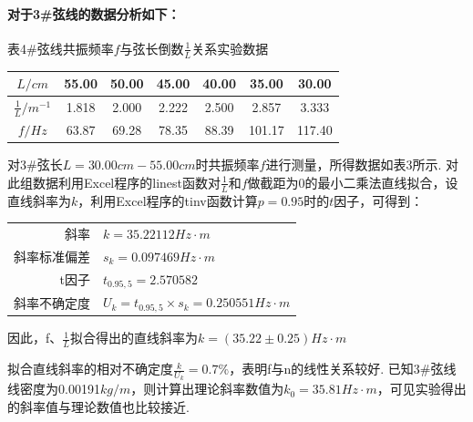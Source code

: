 \documentclass[UTF8]{ctexart}
\begin{document}
\paragraph{对于3\#弦线的数据分析如下：}
\begin{center}
{\kaishu 表4\#弦线共振频率$f$与弦长倒数$\frac{1}{L}$关系实验数据}
\begin{tabular}{|c|c|c|c|c|c|c|}
\hline
	$L/cm$&55.00&50.00&45.00&40.00&35.00&30.00\\
\hline
	$\frac{1}{L}/m^{-1}$&1.818&2.000&2.222&2.500&2.857&3.333\\
\hline
	{$f/Hz$}&{63.87}&{69.28}&{78.35}&{88.39}&{101.17}&{117.40}\\
\hline
\end{tabular}
\end{center}
\par 对3\#弦长${L} = 30.00cm - 55.00cm$时共振频率$f$进行测量，所得数据如表3所示. 对此组数据利用Excel程序的linest函数对$\frac{1}{L}$和$f$做截距为0的最小二乘法直线拟合，设直线斜率为$k$，利用Excel程序的tinv函数计算$p = 0.95$时的$t$因子，可得到：\par
\begin{center}\begin{tabular}{r l}
{斜率}& {$k=35.22112Hz\cdot m$}\\
{斜率标准偏差}& {$s_k=0.097469Hz\cdot m$}\\
{t因子}& {$t_{0.95,5}=2.570582$}\\
{斜率不确定度}& {$U_k=t_{0.95,5}\times s_k = 0.250551Hz\cdot m$}
\end{tabular}\end{center}
因此，f、$\frac{1}{L}$拟合得出的直线斜率为$k=(35.22\pm0.25)Hz\cdot m$\par
\begin{figure}[H]\centering{}
\end{figure}
拟合直线斜率的相对不确定度$\frac{k}{U_k} = 0.7\%$，表明f与n的线性关系较好. 已知3\#弦线线密度为0.00191$kg/m$，则计算出理论斜率数值为$k_0=35.81Hz\cdot m$，可见实验得出的斜率值与理论数值也比较接近.
\end{document}
